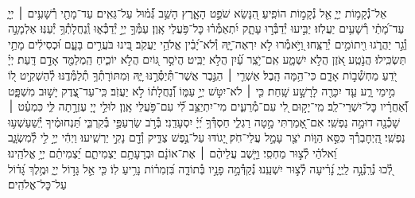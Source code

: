 \documentclass[twoside, openany, parskip=half, 11pt]{book}
\begin{document}
{\\
\vspace{-1.5\baselineskip}
\begin{narrow}
אֵל־נְ֯קָמ֥וֹת יְיָ֑ אֵ֖ל נְ֯קָמ֣וֹת הוֹפִֽיעַ׃
הִ֭נָּשֵׂא שֹׁפֵ֣ט הָאָ֑רֶץ הָשֵׁ֥ב גְּ֯֝מ֗וּל עַל־גֵּאִֽים׃
עַד־מָתַ֖י רְ֯שָׁעִ֥ים ׀ יְיָ֑ עַד־מָ֝תַ֗י רְ֯שָׁעִ֥ים יַעֲלֹֽזוּ׃
יַבִּ֣יעוּ יְ֯דַבְּ֯ר֣וּ עָתָ֑ק יִ֝תְאַמְּ֯ר֗וּ כׇּל־פֹּ֥עֲלֵי אָֽוֶן׃
עַמְּ֯ךָ֣ יְיָ֣ יְ֯דַכְּ֯א֑וּ וְֽ֯נַחֲלָתְ֯ךָ֥ יְ֯עַנּֽוּ׃
אַלְמָנָ֣ה וְ֯גֵ֣ר יַהֲרֹ֑גוּ וִ֖יתוֹמִ֣ים יְ֯רַצֵּֽחוּ׃
וַ֭יֹּ֣אמְ֯רוּ לֹ֣א יִרְאֶה־יׇּ֑הּ וְ֯לֹא־יָ֝בִ֗ין אֱלֹהֵ֥י יַעֲקֹֽב׃
בִּ֭ינוּ בֹּעֲרִ֣ים בָּעָ֑ם וּ֝כְסִילִ֗ים מָתַ֥י תַּשְׂכִּֽילוּ׃
הֲנֹ֣טַֽע אֹ֭זֶן הֲלֹ֣א יִשְׁמָ֑ע אִֽם־יֹ֥צֵֽר עַ֗֝יִן הֲלֹ֣א יַבִּֽיט׃
הֲיֹסֵ֣ר גּ֭וֹיִם הֲלֹ֣א יוֹכִ֑יחַ הַֽמְלַמֵּ֖ד אָדָ֣ם דָּֽעַת׃
יְיָ֗ יֹ֭דֵעַ מַחְשְׁ֯ב֣וֹת אָדָ֑ם כִּי־הֵ֥מָּה הָֽבֶל׃
אַשְׁרֵ֤י ׀ הַגֶּ֣בֶר אֲשֶׁר־תְּ֯יַסְּ֯רֶ֣נּוּ יׇּ֑הּ וּֽמִתּוֹרָתְ֯ךָ֥ תְ֯לַמְּ֯דֶֽנּוּ׃
לְ֯הַשְׁקִ֣יט ל֭וֹ מִ֣ימֵי רָ֑ע עַ֤ד יִכָּרֶ֖ה לָרָשָׁ֣ע שָֽׁחַת׃
כִּ֤י ׀ לֹא־יִטֹּ֣שׁ יְיָ֣ עַמּ֑וֹ וְ֯֝נַחֲלָת֗וֹ לֹ֣א יַעֲזֹֽב׃
כִּֽי־עַד־צֶ֭דֶק יָשׁ֣וּב מִשְׁפָּ֑ט וְ֯֝אַחֲרָ֗יו כׇּל־יִשְׁרֵי־לֵֽב׃
מִֽי־יָק֣וּם לִ֭י עִם־מְ֯רֵעִ֑ים מִי־יִתְיַצֵּ֥ב לִ֗֝י עִם־פֹּ֥עֲלֵי אָֽוֶן׃
לוּלֵ֣י יְיָ֭ עֶזְרָ֣תָה לִּ֑י כִּמְעַ֓ט ׀ שָׁכְ֯נָ֖ה דוּמָ֣ה נַפְשִֽׁי׃
אִם־אָ֭מַרְתִּי מָ֣טָה רַגְלִ֑י חַסְדְּ֯ךָ֥ יְ֝יָ֗ יִסְעָדֵֽנִי׃
בְּ֯רֹ֣ב שַׂרְעַפַּ֣י בְּ֯קִרְבִּ֑י תַּ֝נְחוּמֶ֗יךָ יְֽ֯שַׁעַשְׁע֥וּ נַפְשִֽׁי׃
הַֽ֭יְחׇבְרְ֯ךָ כִּסֵּ֣א הַוּ֑וֹת יֹצֵ֖ר עָמָ֣ל עֲלֵי־חֹֽק׃
יָ֭גוֹדּוּ עַל־נֶ֣פֶשׁ צַדִּ֑יק וְ֯דָ֖ם נָקִ֣י יַרְשִֽׁיעוּ׃
וַיְהִ֬י יְיָ֣ לִ֣י לְ֯מִשְׂגָּ֑ב וֵ֝אלֹהַ֗י לְ֯צ֣וּר מַחְסִֽי׃
וַיָּ֤שֶׁב עֲלֵיהֶ֨ם ׀ אֶת־אוֹנָ֗ם וּבְרָעָתָ֥ם יַצְמִיתֵ֑ם יַ֝צְמִיתֵ֗ם יְיָ֥ אֱלֹהֵֽינוּ׃\\

לְ֭֯כוּ נְ֯רַֽנְ֯נָ֣ה לַֽיְיָ֑ נָ֝רִ֗יעָה לְ֯צ֣וּר יִשְׁעֵֽנוּ׃ נְ֯קַדְּ֯מָ֣ה פָנָ֣יו בְּ֯תוֹדָ֑ה בִּ֝זְמִר֗וֹת נָרִ֥יעַ לֽוֹ׃ כִּ֤י אֵ֣ל גָּד֣וֹל יְיָ֑ וּמֶ֥לֶךְ גָּ֝ד֗וֹל עַל־כׇּל־אֱלֹהִֽים׃
\end{narrow}

}
\end{document}

